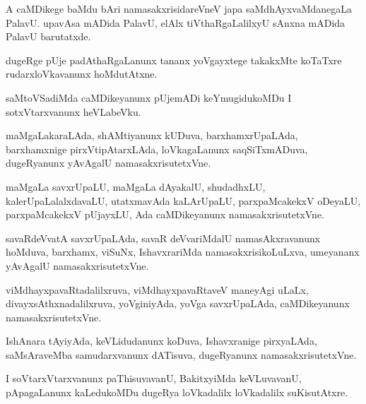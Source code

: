 \documentclass{article}
\begin{document}
\begin{mng}%
A caMDikege baMdu bAri namasakxrisidareVneV japa saMdhAyxvaMdanegaLa PalavU. upavAsa mADida 
PalavU, elAlx tiVthaRgaLalilxyU sAnxna mADida PalavU barutatxde.
\end{mng}

\begin{mng}%
dugeRge pUje padAthaRgaLanunx tananx yoVgayxtege takakxMte koTaTxre rudarxloVkavanunx hoMdutAtxne.
\end{mng}

\begin{mng}%
saMtoVSadiMda caMDikeyanunx pUjemADi keYmugidukoMDu I sotxVtarxvanunx heVLabeVku.
\end{mng}

\begin{mng}%
maMgaLakaraLAda, shAMtiyanunx kUDuva, barxhamxrUpaLAda, barxhamxnige pirxVtipAtarxLAda, 
loVkagaLanunx saqSiTxmADuva, dugeRyanunx yAvAgalU namasakxrisutetxVne.
\end{mng}

\begin{mng}%
maMgaLa savxrUpaLU, maMgaLa dAyakalU, shudadhxLU, kalerUpaLalalxdavaLU, utatxmavAda kaLArUpaLU, 
parxpaMcakekxV oDeyaLU, parxpaMcakekxV pUjayxLU, Ada caMDikeyanunx namasakxrisutetxVne.
\end{mng}

\begin{mng}%
savaRdeVvatA savxrUpaLAda, savaR deVvariMdalU namasAkxravanunx hoMduva, barxhamx, viSuNx, 
IshavxrariMda namasakxrisikoLuLxva, umeyananx yAvAgalU namasakxrisutetxVne.
\end{mng}

\begin{mng}%
viMdhayxpavaRtadalilxruva, viMdhayxpavaRtaveV maneyAgi uLaLx, divayxsAthxnadalilxruva, 
yoVginiyAda, yoVga savxrUpaLAda, caMDikeyanunx namasakxrisutetxVne.
\end{mng}

\begin{mng}%
IshAnara tAyiyAda, keVLidudanunx koDuva, Ishavxranige pirxyaLAda, saMsAraveMba samudarxvanunx 
dATisuva, dugeRyanunx namasakxrisutetxVne.
\end{mng}

\begin{mng}%
I soVtarxVtarxvanunx paThisuvavanU, BakitxyiMda keVLuvavanU, pApagaLanunx kaLedukoMDu dugeRya 
loVkadalilx loVkadalilx suKisutAtxre.
\end{mng}

\end{document}
